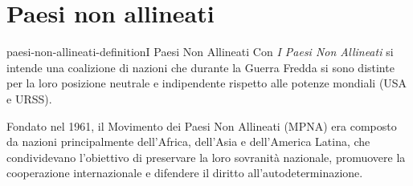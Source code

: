\documentclass[preview]{standalone}
\begin{document}
\genpage

\section{Paesi non allineati}

\begin{snippetdefinition}{paesi-non-allineati-definition}{I Paesi Non Allineati}
    Con \textit{I Paesi Non Allineati} si intende una coalizione di nazioni che durante la Guerra Fredda
    si sono distinte per la loro posizione neutrale e indipendente rispetto alle potenze mondiali (USA e URSS).
\end{snippetdefinition}

\begin{plainhtml}
    Fondato nel 1961, il Movimento dei Paesi Non Allineati (MPNA) era composto da nazioni principalmente dell'Africa, dell'Asia e dell'America Latina, che condividevano l'obiettivo di preservare la loro sovranità nazionale, promuovere la cooperazione internazionale e difendere il diritto all'autodeterminazione.
\end{plainhtml}
\end{document}
